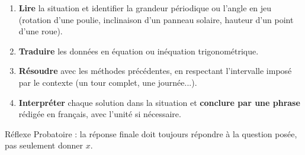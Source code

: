 \documentclass[11pt]{article}
\begin{document}
\begin{methode}
\begin{enumerate}
\item \textbf{Lire} la situation et identifier la grandeur périodique ou l'angle en jeu (rotation d'une poulie, inclinaison d'un panneau solaire, hauteur d'un point d'une roue).
\item \textbf{Traduire} les données en équation ou inéquation trigonométrique.
\item \textbf{Résoudre} avec les méthodes précédentes, en respectant l'intervalle imposé par le contexte (un tour complet, une journée...).
\item \textbf{Interpréter} chaque solution dans la situation et \textbf{conclure par une phrase} rédigée en français, avec l'unité si nécessaire.
\end{enumerate}
Réflexe Probatoire : la réponse finale doit toujours répondre à la question posée, pas seulement donner $x$.
\end{methode}
\end{document}
